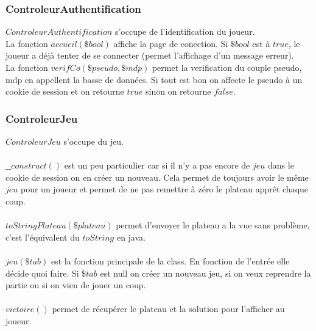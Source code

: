 \documentclass{article}
\begin{document}
        \subsubsection{ControleurAuthentification}
            $ControleurAuthentification$ s'occupe de l'identification du joueur.\\
            La fonction $accueil(\$bool)$ affiche la page de conection. Si $\$bool$ est à $true$, le joueur a déjà tenter de se connecter (permet l'affichage d'un message erreur).\\
            La fonction $verifCo(\$pseudo, \$mdp)$ permet la verification du couple pseudo, mdp en appellent la basse de données. Si tout est bon on affecte le pseudo à un cookie de session et on retourne $true$ sinon on retourne $false$.
        
        \subsubsection{ControleurJeu}
            $ControleurJeu$ s'occupe du jeu.
            
            \paragraph{}
            $\_\_construct()$ est un peu particulier car si il n'y a pas encore de $jeu$ dans le cookie de session on en créer un nouveau. Cela permet de toujours avoir le même $jeu$ pour un joueur et permet de ne pas remettre à zéro le plateau apprêt chaque coup.
            
            \paragraph{}
            $toStringPlateau(\$plateau)$ permet d'envoyer le plateau a la vue sans problème, c'est l'équivalent du $toString$ en java.
        
            \paragraph{}
            $jeu(\$tab)$ est la fonction principale de la class. En fonction de l'entrée elle décide quoi faire. Si $\$tab$ est null on créer un nouveau jeu, si on veux reprendre la partie ou si on vien de jouer un coup. 
           
            \paragraph{}
            $victoire()$ permet de récupérer le plateau et la solution pour l'afficher au joueur.
            
\end{document}
